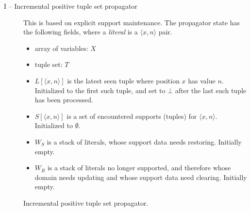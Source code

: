 \documentclass[a4paper,11pt]{article}
\newcommand{\Extensional}{\Constraint{Extensional}~}
\newcommand{\FOREACH}[1]{\FORALL{{#1} \textbf{do}}}
\newcommand{\ENDFOREACH}{\ENDFOR}
\def\PROCEDURE{\item[\textbf{PROCEDURE}]}
\def\bool{\mathit{bool}}
\def\FindSupport{\textsc{FindSupport}}
\def\RemoveSupport{\textsc{RemoveSupport}}
\def\Extensional{\textsc{Extensional}}
\numberwithin{equation}{section}
\begin{document}
\begin{description}
   \item[I -- Incremental positive tuple set propagator]
     This is based on explicit support maintenance.  The propagator state
has the following fields, where a \emph{literal} is a $\langle x,n
\rangle$ pair.

\begin{itemize}
\item array of variables: $X$
\item tuple set: $T$
\item $L[\langle x,n \rangle]$ is the latest seen tuple where position
  $x$ has value $n$.  Initialized to the first such tuple, and set to
  $\bot$ after the last such tuple has been processed.
\item $S[\langle x,n \rangle]$ is a set of encountered supports
  (tuples) for $\langle x,n \rangle$.  Initialized to $\emptyset$.
\item $W_S$ is a stack of literals, whose support data needs restoring.
  Initially empty.
\item $W_R$ is a stack of literals no longer supported, and therefore
  whose domain needs updating and whose support data need clearing.  Initially empty.
\end{itemize}


\begin{algorithm}
\caption{Incremental positive tuple set propagator.}
\end{algorithm}


\end{description}
\end{document}
